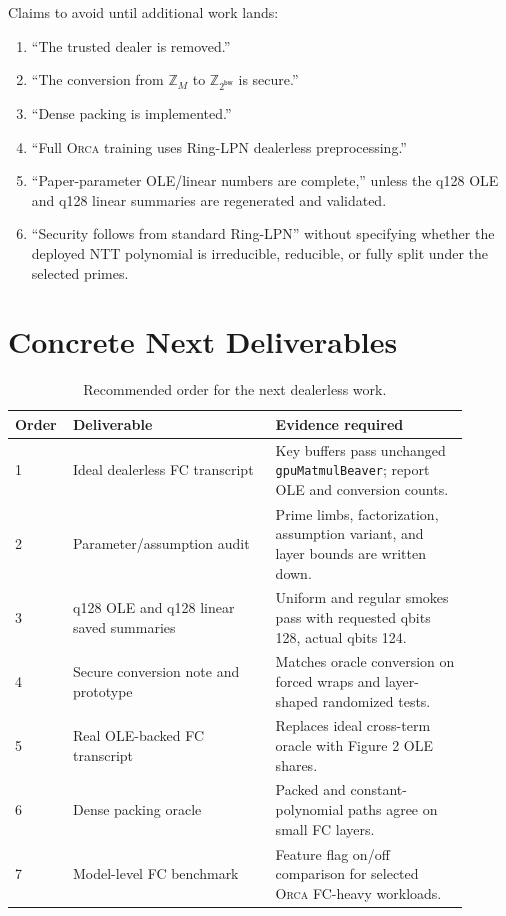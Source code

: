 \documentclass[11pt]{article}
\newcommand{\Z}{\mathbb{Z}}
\newcommand{\modtwo}{\Z_{2^{\mathsf{bw}}}}
\newcommand{\Orca}{\textsc{Orca}}
\begin{document}
Claims to avoid until additional work lands:
\begin{enumerate}[leftmargin=*]
  \item ``The trusted dealer is removed.''
  \item ``The conversion from \(\Z_M\) to \(\modtwo\) is secure.''
  \item ``Dense packing is implemented.''
  \item ``Full \Orca{} training uses Ring-LPN dealerless preprocessing.''
  \item ``Paper-parameter OLE/linear numbers are complete,'' unless the q128
  OLE and q128 linear summaries are regenerated and validated.
  \item ``Security follows from standard Ring-LPN'' without specifying
  whether the deployed NTT polynomial is irreducible, reducible, or fully
  split under the selected primes.
\end{enumerate}

\section{Concrete Next Deliverables}

\begin{table}[h]
\centering
\small
\begin{tabular}{p{0.08\linewidth}p{0.42\linewidth}p{0.40\linewidth}}
\toprule
Order & Deliverable & Evidence required \\
\midrule
1 & Ideal dealerless FC transcript & Key buffers pass unchanged
\texttt{gpuMatmulBeaver}; report OLE and conversion counts. \\
2 & Parameter/assumption audit & Prime limbs, factorization, assumption
variant, and layer bounds are written down. \\
3 & q128 OLE and q128 linear saved summaries & Uniform and regular smokes pass
with requested qbits 128, actual qbits 124. \\
4 & Secure conversion note and prototype & Matches oracle conversion on forced
wraps and layer-shaped randomized tests. \\
5 & Real OLE-backed FC transcript & Replaces ideal cross-term oracle with
Figure 2 OLE shares. \\
6 & Dense packing oracle & Packed and constant-polynomial paths agree on
small FC layers. \\
7 & Model-level FC benchmark & Feature flag on/off comparison for selected
\Orca{} FC-heavy workloads. \\
\bottomrule
\end{tabular}
\caption{Recommended order for the next dealerless work.}
\end{table}
\end{document}
